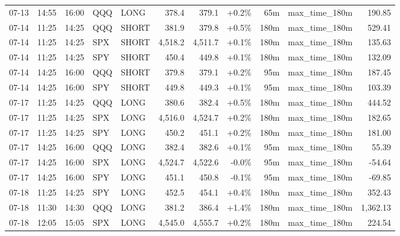 \documentclass[11pt,a4paper,twoside]{article}
\begin{document}
\begin{center}
\begin{longtable}{>{\color{txtmain}}l l l l l r r r r >{\color{txtmain}}l r}
07-13 & 14:55 & 16:00 & QQQ & LONG & 378.4 & 379.1 & \textcolor{wingreen}{+0.2\%} & 65m & max\_time\_180m & \textcolor{wingreen}{190.85} \\
07-14 & 11:25 & 14:25 & QQQ & SHORT & 381.9 & 379.8 & \textcolor{wingreen}{+0.5\%} & 180m & max\_time\_180m & \textcolor{wingreen}{529.41} \\
07-14 & 11:25 & 14:25 & SPX & SHORT & 4,518.2 & 4,511.7 & \textcolor{wingreen}{+0.1\%} & 180m & max\_time\_180m & \textcolor{wingreen}{135.63} \\
07-14 & 11:25 & 14:25 & SPY & SHORT & 450.4 & 449.8 & \textcolor{wingreen}{+0.1\%} & 180m & max\_time\_180m & \textcolor{wingreen}{132.09} \\
07-14 & 14:25 & 16:00 & QQQ & SHORT & 379.8 & 379.1 & \textcolor{wingreen}{+0.2\%} & 95m & max\_time\_180m & \textcolor{wingreen}{187.45} \\
07-14 & 14:25 & 16:00 & SPY & SHORT & 449.8 & 449.3 & \textcolor{wingreen}{+0.1\%} & 95m & max\_time\_180m & \textcolor{wingreen}{103.39} \\
07-17 & 11:25 & 14:25 & QQQ & LONG & 380.6 & 382.4 & \textcolor{wingreen}{+0.5\%} & 180m & max\_time\_180m & \textcolor{wingreen}{444.52} \\
07-17 & 11:25 & 14:25 & SPX & LONG & 4,516.0 & 4,524.7 & \textcolor{wingreen}{+0.2\%} & 180m & max\_time\_180m & \textcolor{wingreen}{182.65} \\
07-17 & 11:25 & 14:25 & SPY & LONG & 450.2 & 451.1 & \textcolor{wingreen}{+0.2\%} & 180m & max\_time\_180m & \textcolor{wingreen}{181.00} \\
07-17 & 14:25 & 16:00 & QQQ & LONG & 382.4 & 382.6 & \textcolor{wingreen}{+0.1\%} & 95m & max\_time\_180m & \textcolor{wingreen}{55.39} \\
07-17 & 14:25 & 16:00 & SPX & LONG & 4,524.7 & 4,522.6 & \textcolor{lossred}{-0.0\%} & 95m & max\_time\_180m & \textcolor{lossred}{-54.64} \\
07-17 & 14:25 & 16:00 & SPY & LONG & 451.1 & 450.8 & \textcolor{lossred}{-0.1\%} & 95m & max\_time\_180m & \textcolor{lossred}{-69.85} \\
07-18 & 11:25 & 14:25 & SPY & LONG & 452.5 & 454.1 & \textcolor{wingreen}{+0.4\%} & 180m & max\_time\_180m & \textcolor{wingreen}{352.43} \\
07-18 & 11:30 & 14:30 & QQQ & LONG & 381.2 & 386.4 & \textcolor{wingreen}{+1.4\%} & 180m & max\_time\_180m & \textcolor{wingreen}{1,362.13} \\
07-18 & 12:05 & 15:05 & SPX & LONG & 4,545.0 & 4,555.7 & \textcolor{wingreen}{+0.2\%} & 180m & max\_time\_180m & \textcolor{wingreen}{224.54} \\

\end{longtable}
\end{center}
\end{document}
